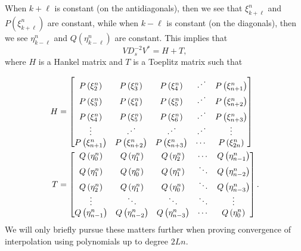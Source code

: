
When $k+\ell$ is constant (on the antidiagonals), then we see that
$\xi_{k+\ell}^{n}$ and $P(\xi_{k+\ell}^{n})$ are constant, while
when $k-\ell$ is constant (on the diagonals), then we see
$\eta_{k-\ell}^{n}$ and $Q(\eta_{k-\ell}^{n})$ are constant.
This implies that
%
\begin{equation}
    VD_{s}^{-2}V^{*} = H + T,
\end{equation}
%
where $H$ is a Hankel matrix and $T$ is a Toeplitz matrix such that

\begin{align}
    H &= \begin{bmatrix}
        P\left( \xi_{2}^{n} \right) & P\left( \xi_{3}^{n} \right) & P\left( \xi_{4}^{n} \right)
            & \iddots & P\left( \xi_{n+1}^{n} \right) \\
        P\left( \xi_{3}^{n} \right) & P\left( \xi_{4}^{n} \right) & P\left( \xi_{5}^{n} \right)
            & \iddots & P\left( \xi_{n+2}^{n} \right) \\
        P\left( \xi_{4}^{n} \right) & P\left( \xi_{5}^{n} \right) & P\left( \xi_{6}^{n} \right)
            & \iddots & P\left( \xi_{n+3}^{n} \right) \\
        \vdots & \iddots & \iddots & \iddots & \vdots \\
        P\left( \xi_{n+1}^{n} \right) & P\left( \xi_{n+2}^{n} \right)
            & P\left( \xi_{n+3}^{n} \right) & \cdots & P\left( \xi_{2n}^{n} \right) \\
        \end{bmatrix} \nonumber\\
    T &= \begin{bmatrix}
        Q\left( \eta_{0}^{n} \right) & Q\left( \eta_{1}^{n} \right) & Q\left( \eta_{2}^{n} \right)
            & \cdots & Q\left( \eta_{n-1}^{n} \right) \\
        Q\left( \eta_{1}^{n} \right) & Q\left( \eta_{0}^{n} \right) & Q\left( \eta_{1}^{n} \right)
            & \ddots & Q\left( \eta_{n-2}^{n} \right) \\
        Q\left( \eta_{2}^{n} \right) & Q\left( \eta_{1}^{n} \right) & Q\left( \eta_{0}^{n} \right)
            & \ddots & Q\left( \eta_{n-3}^{n} \right) \\
        \vdots & \ddots & \ddots & \ddots & \vdots \\
        Q\left( \eta_{n-1}^{n} \right) & Q\left( \eta_{n-2}^{n} \right) &
            Q\left( \eta_{n-3}^{n} \right) & \cdots & Q\left( \eta_{0}^{n} \right) \\
        \end{bmatrix}.
\end{align}
%
We will only briefly pursue these matters further when
proving convergence of interpolation using polynomials up to degree
$2Ln$.

